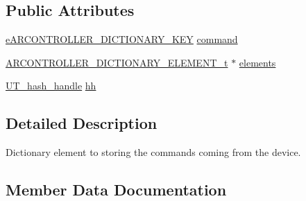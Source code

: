 \subsection*{Public Attributes}
\begin{DoxyCompactItemize}
\item 
\hyperlink{_a_r_c_o_n_t_r_o_l_l_e_r___d_i_c_t_i_o_n_a_r_y___key_8h_ae92cbeea4c7fd5c692922dc950fd2004}{e\+A\+R\+C\+O\+N\+T\+R\+O\+L\+L\+E\+R\+\_\+\+D\+I\+C\+T\+I\+O\+N\+A\+R\+Y\+\_\+\+K\+EY} \hyperlink{struct_a_r_c_o_n_t_r_o_l_l_e_r___d_i_c_t_i_o_n_a_r_y___c_o_m_m_a_n_d_s__t_afe6d0070d7b54bb4fbc912df3fd9359b}{command}
\item 
\hyperlink{struct_a_r_c_o_n_t_r_o_l_l_e_r___d_i_c_t_i_o_n_a_r_y___e_l_e_m_e_n_t__t}{A\+R\+C\+O\+N\+T\+R\+O\+L\+L\+E\+R\+\_\+\+D\+I\+C\+T\+I\+O\+N\+A\+R\+Y\+\_\+\+E\+L\+E\+M\+E\+N\+T\+\_\+t} $\ast$ \hyperlink{struct_a_r_c_o_n_t_r_o_l_l_e_r___d_i_c_t_i_o_n_a_r_y___c_o_m_m_a_n_d_s__t_a6fbf2ad72eb12006512c5ca26c879907}{elements}
\item 
\hyperlink{struct_u_t__hash__handle}{U\+T\+\_\+hash\+\_\+handle} \hyperlink{struct_a_r_c_o_n_t_r_o_l_l_e_r___d_i_c_t_i_o_n_a_r_y___c_o_m_m_a_n_d_s__t_ad7e30da879b410e4625a766eeb7676e6}{hh}
\end{DoxyCompactItemize}


\subsection{Detailed Description}
Dictionary element to storing the commands coming from the device. 

\subsection{Member Data Documentation}
